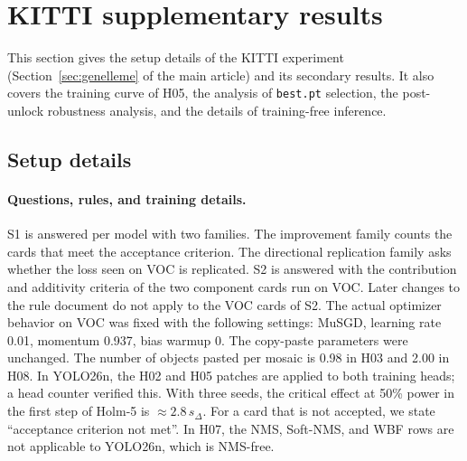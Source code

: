\setcounter{table}{0}\setcounter{figure}{0}
\section{KITTI supplementary results}\label{sec:ek-ikincil}

This section gives the setup details of the KITTI experiment (Section~\ref{sec:genelleme} of the main article) and its secondary results. It also covers the training curve of H05, the analysis of \texttt{best.pt} selection, the post-unlock robustness analysis, and the details of training-free inference.

\subsection{Setup details}\label{sec:ek-kitti-kurulum}

\paragraph{Questions, rules, and training details.}
S1 is answered per model with two families. The improvement family counts the cards that meet the acceptance criterion. The directional replication family asks whether the loss seen on VOC is replicated. S2 is answered with the contribution and additivity criteria of the two component cards run on VOC. Later changes to the rule document do not apply to the VOC cards of S2. The actual optimizer behavior on VOC was fixed with the following settings: MuSGD, learning rate 0.01, momentum 0.937, bias warmup 0. The copy-paste parameters were unchanged. The number of objects pasted per mosaic is 0.98 in H03 and 2.00 in H08. In YOLO26n, the H02 and H05 patches are applied to both training heads; a head counter verified this. With three seeds, the critical effect at 50\% power in the first step of Holm-5 is $\approx2.8\,s_\Delta$. For a card that is not accepted, we state ``acceptance criterion not met''. In H07, the NMS, Soft-NMS, and WBF rows are not applicable to YOLO26n, which is NMS-free.

